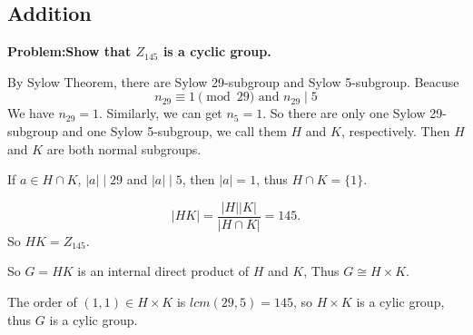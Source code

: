 \documentclass[draft]{article}
\begin{document}
		\subsection*{Addition}
			\textbf{Problem:Show that $Z_{145}$ is a cyclic group.}

			By Sylow Theorem, there are Sylow 29-subgroup and Sylow 5-subgroup.
			Beacuse
			$$
				n_{29} \equiv 1 \pmod{29} \text{ and } n_{29} \mid 5
			$$
			We have $n_{29} = 1$. Similarly, we can get $n_5 = 1$.
			So there are only one Sylow 29-subgroup and one Sylow 5-subgroup, we call
			them $H$ and $K$, respectively. Then $H$ and $K$ are both normal
			subgroups.

			If $a \in H\cap K$, $\vert a \vert \mid 29$ and $\vert a \vert \mid 5$,
			then $\vert a \vert = 1$, thus $H\cap K = \{1\}$.

			$$\vert HK \vert = \frac{\vert H \vert \vert K \vert}{\vert H \cap K \vert}
			= 145.$$
			So $HK = Z_{145}$.

			So $G = HK$ is an internal direct product of $H$ and $K$, Thus $G \cong H
			\times K$.

			The order of $(1,1) \in H \times K$ is $lcm(29,5) = 145$, so $H\times K$
			is a cylic group, thus $G$ is a cylic group.
\end{document}

